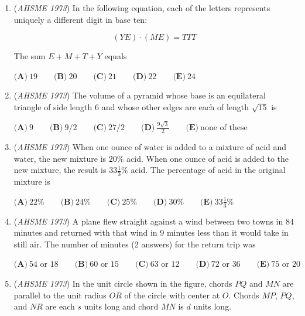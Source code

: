 \begin{enumerate}
 $\textbf{(A)}\ \text{the point } (0,0) \text{ does not belong to } S \text{ for any } t \qquad$
$\textbf{(B)}\ 0 \leq \text{Area } S \leq \pi \text{ for all } t \qquad$
$\textbf{(C)}\ S \text{ is contained in the first quadrant for all } t \geq 5 \qquad$
$\textbf{(D)}\ \text{the center of } S \text{ for any } t \text{ is on the line } y=x \qquad$
$\textbf{(E)}\ \text{none of the other statements is true}$


	\item (\textit{AHSME 1973}) In the following equation, each of the letters represents uniquely a different digit in base ten: 


 
 \[(YE) \cdot (ME) = TTT\]


 The sum $E+M+T+Y$ equals 


 $\textbf{(A)}\ 19 \qquad \textbf{(B)}\ 20 \qquad \textbf{(C)}\ 21 \qquad \textbf{(D)}\ 22 \qquad \textbf{(E)}\ 24$


	\item (\textit{AHSME 1973}) The volume of a pyramid whose base is an equilateral triangle of side length 6 and whose other edges are each of length $\sqrt{15}$ is 


 $\textbf{(A)}\ 9 \qquad \textbf{(B)}\ 9/2 \qquad \textbf{(C)}\ 27/2 \qquad \textbf{(D)}\ \frac{9\sqrt3}{2} \qquad \textbf{(E)}\ \text{none of these}$


	\item (\textit{AHSME 1973}) When one ounce of water is added to a mixture of acid and water, the new mixture is $20\%$ acid. When one ounce of acid is added to the new mixture, the result is $33\frac13\%$ acid. The percentage of acid in the original mixture is


 $\textbf{(A)}\ 22\% \qquad \textbf{(B)}\ 24\% \qquad \textbf{(C)}\ 25\% \qquad \textbf{(D)}\ 30\% \qquad \textbf{(E)}\ 33\frac13 \%$


	\item (\textit{AHSME 1973}) A plane flew straight against a wind between two towns in 84 minutes and returned with that wind in 9 minutes less than it would take in still air. The number of minutes (2 answers) for the return trip was


 $\textbf{(A)}\ 54 \text{ or } 18 \qquad \textbf{(B)}\ 60 \text{ or } 15 \qquad \textbf{(C)}\ 63 \text{ or } 12 \qquad \textbf{(D)}\ 72 \text{ or } 36 \qquad \textbf{(E)}\ 75 \text{ or } 20$


	\item (\textit{AHSME 1973}) In the unit circle shown in the figure, chords $PQ$ and $MN$ are parallel to the unit radius $OR$ of the circle with center at $O$. Chords $MP$, $PQ$, and $NR$ are each $s$ units long and chord $MN$ is $d$ units long. 



\end{enumerate}
